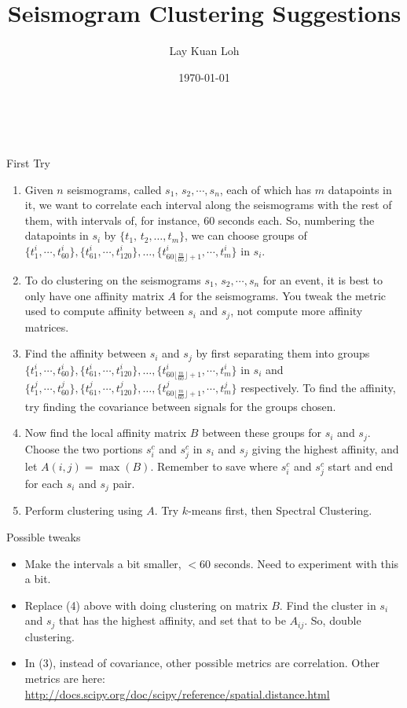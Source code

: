 \documentclass[a4paper, 11pt]{article} %
\title{Seismogram Clustering Suggestions} %
\author{Lay Kuan Loh} %
\date{\today} %
\makeatletter
\renewcommand{\maketitle}{ %
\begin{flushright} %
{\LARGE\@title} %

\vspace{50pt} %

{\large\@author} %
\\\@date %

\vspace{40pt} %
\end{flushright}
}
\makeatother
\begin{document}
\maketitle %

First Try

\begin{enumerate}
 	\item Given $n$ seismograms, called $s_1,\,s_2,\cdots,s_n$, each of which has $m$ datapoints in it, we want to correlate each interval along the seismograms with the rest of them, with intervals of, for instance, 60 seconds each. So, numbering the datapoints in $s_i$ by $\{t_1,\,t_2,\ldots,t_m\}$, we can choose groups of $\{t^i_1,\cdots,t^i_{60}\},\{t^i_{61},\cdots,t^i_{120}\},\ldots,\{t^i_{60\lfloor\frac{m}{60}\rfloor+ 1},\cdots,t^i_m\}$ in $s_i$. 

	\item To do clustering on the seismograms $s_1,\,s_2,\cdots,s_n$ for an event, it is best to only have one affinity matrix $A$ for the seismograms. You tweak the metric used to compute affinity between $s_i$ and $s_j$, not compute more affinity matrices. 

	\item Find the affinity between $s_i$ and $s_j$ by first separating them into groups $\{t^i_1,\cdots,t^i_{60}\},\{t^i_{61},\cdots,t^i_{120}\},\ldots,\{t^i_{60\lfloor\frac{m}{60}\rfloor+ 1},\cdots,t^i_m\}$ in $s_i$ and $\{t^j_1,\cdots,t^j_{60}\},\{t^j_{61},\cdots,t^j_{120}\},\ldots,\{t^j_{60\lfloor\frac{m}{60}\rfloor+ 1},\cdots,t^j_m\}$ respectively. To find the affinity, try finding the covariance between signals for the groups chosen. 

	\item Now find the local affinity matrix $B$ between these groups for $s_i$ and $s_j$. Choose the two portions $s_i^c$ and $s_j^c$ in $s_i$ and $s_j$ giving the highest affinity, and let $A(i,j) = \max(B)$. Remember to save where $s_i^c$ and $s_j^c$ start and end for each $s_i$ and $s_j$ pair. 

	\item Perform clustering using $A$. Try $k$-means first, then Spectral Clustering.
\end{enumerate}

Possible tweaks
\begin{itemize}
    \item Make the intervals a bit smaller, $<60$ seconds. Need to experiment with this a bit.
    \item Replace (4) above with doing clustering on matrix $B$. Find the cluster in $s_i$ and $s_j$ that has the highest affinity, and set that to be $A_{ij}$. So, double clustering. 
    \item In (3), instead of covariance, other possible metrics are correlation. Other metrics are here: \url{http://docs.scipy.org/doc/scipy/reference/spatial.distance.html}
\end{itemize}






\end{document}
